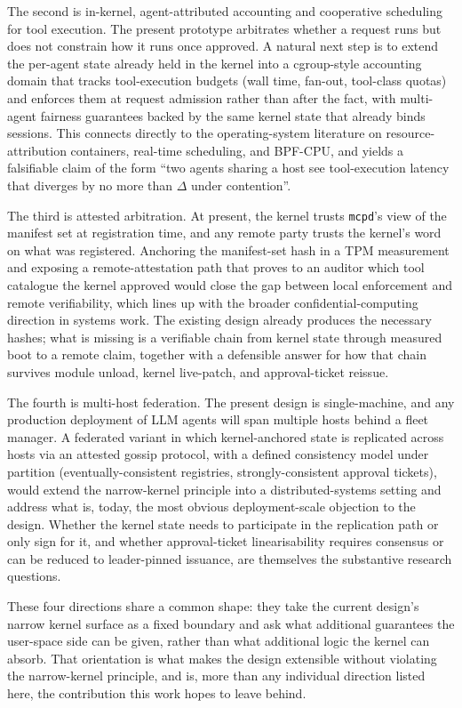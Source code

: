 The second is in-kernel, agent-attributed accounting and cooperative scheduling for tool execution.
The present prototype arbitrates whether a request runs but does not constrain how it runs once approved.
A natural next step is to extend the per-agent state already held in the kernel into a cgroup-style accounting domain that tracks tool-execution budgets (wall time, fan-out, tool-class quotas) and enforces them at request admission rather than after the fact, with multi-agent fairness guarantees backed by the same kernel state that already binds sessions.
This connects directly to the operating-system literature on resource-attribution containers, real-time scheduling, and BPF-CPU, and yields a falsifiable claim of the form ``two agents sharing a host see tool-execution latency that diverges by no more than $\Delta$ under contention''.

The third is attested arbitration.
At present, the kernel trusts \texttt{mcpd}'s view of the manifest set at registration time, and any remote party trusts the kernel's word on what was registered.
Anchoring the manifest-set hash in a TPM measurement and exposing a remote-attestation path that proves to an auditor which tool catalogue the kernel approved would close the gap between local enforcement and remote verifiability, which lines up with the broader confidential-computing direction in systems work.
The existing design already produces the necessary hashes; what is missing is a verifiable chain from kernel state through measured boot to a remote claim, together with a defensible answer for how that chain survives module unload, kernel live-patch, and approval-ticket reissue.

The fourth is multi-host federation.
The present design is single-machine, and any production deployment of LLM agents will span multiple hosts behind a fleet manager.
A federated variant in which kernel-anchored state is replicated across hosts via an attested gossip protocol, with a defined consistency model under partition (eventually-consistent registries, strongly-consistent approval tickets), would extend the narrow-kernel principle into a distributed-systems setting and address what is, today, the most obvious deployment-scale objection to the design.
Whether the kernel state needs to participate in the replication path or only sign for it, and whether approval-ticket linearisability requires consensus or can be reduced to leader-pinned issuance, are themselves the substantive research questions.

These four directions share a common shape: they take the current design's narrow kernel surface as a fixed boundary and ask what additional guarantees the user-space side can be given, rather than what additional logic the kernel can absorb.
That orientation is what makes the design extensible without violating the narrow-kernel principle, and is, more than any individual direction listed here, the contribution this work hopes to leave behind.
